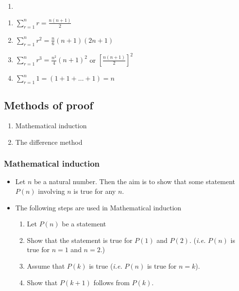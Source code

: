 \documentclass[]{book}
\providecommand{\tightlist}{%
  \setlength{\itemsep}{0pt}\setlength{\parskip}{0pt}}
\begin{document}
\begin{enumerate}
\def\labelenumi{(\arabic{enumi})}
\setcounter{enumi}{2}
\item
\end{enumerate}

\begin{enumerate}
\def\labelenumi{(\alph{enumi})}
\item
  \(\sum_{r=1}^nr=\frac{n(n+1)}{2}\)
\item
  \(\sum_{r=1}^nr^2=\frac{n}{6}(n+1)(2n+1)\)
\item
  \(\sum_{r=1}^nr^3=\frac{n^2}{4}(n+1)^2\) or \(\left[\frac{n(n+1)}{2}\right]^2\)
\item
  \(\sum_{r=1}^n1=(1+1+\dots+1) = n\)
\end{enumerate}

\hypertarget{methods-of-proof}{%
\subsection{Methods of proof}\label{methods-of-proof}}

\begin{enumerate}
\def\labelenumi{\arabic{enumi}.}
\tightlist
\item
  Mathematical induction
\item
  The difference method
\end{enumerate}

\hypertarget{mathematical-induction}{%
\subsubsection{Mathematical induction}\label{mathematical-induction}}

\begin{itemize}
\item
  Let \(n\) be a natural number. Then the aim is to show that some statement \(P(n)\) involving \(n\) is true for any \(n\).
\item
  The following steps are used in Mathematical induction

  \begin{enumerate}
  \def\labelenumi{\arabic{enumi}.}
  \tightlist
  \item
    Let \(P(n)\) be a statement
  \item
    Show that the statement is true for \(P(1)\) and \(P(2)\). (\emph{i.e.} \(P(n)\) is true for \(n=1\) and \(n=2.\))
  \item
    Assume that \(P(k)\) is true (\emph{i.e.} \(P(n)\) is true for \(n=k\)).
  \item
    Show that \(P(k+1)\) follows from \(P(k).\)
  \end{enumerate}
\end{itemize}
\end{document}
